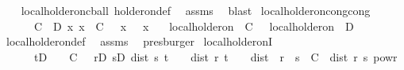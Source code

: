 \begin{isabellebody}
%
\isadelimproof
\ \ %
\endisadelimproof
%
\isatagproof
{}\isamarkupfalse%
\ local{\isacharunderscore}{\kern0pt}holder{\isacharunderscore}{\kern0pt}on{\isacharunderscore}{\kern0pt}cball\ holder{\isacharunderscore}{\kern0pt}on{\isacharunderscore}{\kern0pt}def\ \isamarkupfalse%
\ assms\ \isamarkupfalse%
\ blast%
\endisatagproof
{\isafoldproof}%
%
\isadelimproof
\isanewline
%
\endisadelimproof
\isanewline
{}\isamarkupfalse%
\ local{\isacharunderscore}{\kern0pt}holder{\isacharunderscore}{\kern0pt}on{\isacharunderscore}{\kern0pt}cong{\isacharbrackleft}{\kern0pt}cong{\isacharbrackright}{\kern0pt}{\isacharcolon}{\kern0pt}\isanewline
\ \ \ {\isachardoublequoteopen}{\isasymgamma}\ {\isacharequal}{\kern0pt}\ {\isasymepsilon}{\isachardoublequoteclose}\ {\isachardoublequoteopen}C\ {\isacharequal}{\kern0pt}\ D{\isachardoublequoteclose}\ {\isachardoublequoteopen}{\isasymAnd}x{\isachardot}{\kern0pt}\ x\ {\isasymin}\ C\ {\isasymLongrightarrow}\ {\isasymphi}\ x\ {\isacharequal}{\kern0pt}\ {\isasympsi}\ x{\isachardoublequoteclose}\isanewline
\ \ \ {\isachardoublequoteopen}local{\isacharunderscore}{\kern0pt}holder{\isacharunderscore}{\kern0pt}on\ {\isasymgamma}\ C\ {\isasymphi}\ {\isasymlongleftrightarrow}\ local{\isacharunderscore}{\kern0pt}holder{\isacharunderscore}{\kern0pt}on\ {\isasymepsilon}\ D\ {\isasympsi}{\isachardoublequoteclose}\isanewline
%
\isadelimproof
\ \ %
\endisadelimproof
%
\isatagproof
{}\isamarkupfalse%
\ local{\isacharunderscore}{\kern0pt}holder{\isacharunderscore}{\kern0pt}on{\isacharunderscore}{\kern0pt}def\ \isamarkupfalse%
\ assms\ \isamarkupfalse%
\ presburger%
\endisatagproof
{\isafoldproof}%
%
\isadelimproof
\isanewline
%
\endisadelimproof
\isanewline
{}\isamarkupfalse%
\ local{\isacharunderscore}{\kern0pt}holder{\isacharunderscore}{\kern0pt}onI{\isacharcolon}{\kern0pt}\isanewline
\ \ \ {\isachardoublequoteopen}{\isasymgamma}\ {\isasymin}\ {\isacharbraceleft}{\kern0pt}{}{\isacharless}{\kern0pt}{\isachardot}{\kern0pt}{\isachardot}{\kern0pt}{}{\isacharbraceright}{\kern0pt}{\isachardoublequoteclose}\ {\isachardoublequoteopen}{\isacharparenleft}{\kern0pt}{\isasymforall}t{\isasymin}D{\isachardot}{\kern0pt}\ {\isasymexists}{\isasymepsilon}\ {\isachargreater}{\kern0pt}\ {}{\isachardot}{\kern0pt}\ {\isasymexists}C\ {\isasymge}\ {}{\isachardot}{\kern0pt}\ {\isacharparenleft}{\kern0pt}{\isasymforall}r{\isasymin}D{\isachardot}{\kern0pt}\ {\isasymforall}s{\isasymin}D{\isachardot}{\kern0pt}\ dist\ s\ t\ {\isacharless}{\kern0pt}\ {\isasymepsilon}\ {\isasymand}\ dist\ r\ t\ {\isacharless}{\kern0pt}\ {\isasymepsilon}\ {\isasymlongrightarrow}\ dist\ {\isacharparenleft}{\kern0pt}{\isasymphi}\ r{\isacharparenright}{\kern0pt}\ {\isacharparenleft}{\kern0pt}{\isasymphi}\ s{\isacharparenright}{\kern0pt}\ {\isasymle}\ C\ {\isacharasterisk}{\kern0pt}\ dist\ r\ s\ powr\ {\isasymgamma}{\isacharparenright}{\kern0pt}{\isacharparenright}{\kern0pt}{\isachardoublequoteclose}\isanewline

\end{isabellebody}
